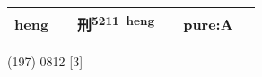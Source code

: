 \documentclass[14pt,a4paper]{scrartcl}
\begin{document}
\begin{longtable}[c]{@{}llllll@{}}
\begin{minipage}[t]{0.14\columnwidth}
heng
\strut\end{minipage} &
\begin{minipage}[t]{0.14\columnwidth}\raggedright\strut
\strut\end{minipage} &
\begin{minipage}[t]{0.14\columnwidth}\raggedright\strut
刑\textsuperscript{5211~heng}
\strut\end{minipage} &
\begin{minipage}[t]{0.14\columnwidth}\raggedright\strut
\strut\end{minipage} &
\begin{minipage}[t]{0.14\columnwidth}\raggedright\strut
pure:A
\strut\end{minipage}\tabularnewline
\bottomrule
\end{longtable}

(197) 0812 {[}3{]}
\end{document}
